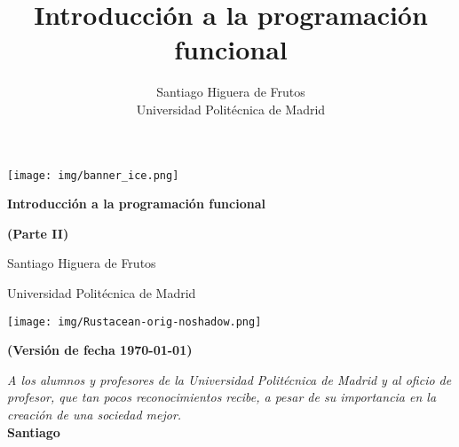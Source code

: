 \documentclass[11pt, table]{book}
\title{Introducción a la programación funcional}
\author{Santiago Higuera de Frutos \\ \vspace{1em}\small Universidad Politécnica de Madrid}
\date{ 
	\begin{center}
		\texttt{[image: img/Rustacean-orig-noshadow.png]}
	\end{center}
   \begin{center}
      \footnotesize \textbf{\color{red}(Versión de fecha  \today)}
   \end{center}
}
\begin{document}
\lstset{language=Rust, style=colouredRust}

\pagestyle{empty}

\begin{center}
   \texttt{[image: img/banner\_ice.png]}
\end{center}

{\centering \vspace{5em} \Huge\bfseries  Introducción a la programación funcional \par}

{\centering \vspace{5em} \Huge\bfseries  (Parte II) \par}

{\vspace{2em} \centering Santiago Higuera de Frutos \par}

{\centering \small Universidad Politécnica de Madrid \par}

\begin{center}
   \texttt{[image: img/Rustacean-orig-noshadow.png]}
\end{center}
\begin{center}
   \footnotesize \textbf{\color{red}(Versión de fecha  \today)}
\end{center}




\blankpage
\pagestyle{empty}

\vfill
\begin{flushright}
\begin{minipage}{0.7\textwidth}
\begin{flushright}
\footnotesize
\textit{A los alumnos y profesores de la Universidad Politécnica de Madrid y al oficio de profesor, que tan pocos reconocimientos recibe, a pesar de su importancia en la creación de una sociedad mejor.} \\
\textbf{Santiago}
\end{flushright}
\end{minipage}
\end{flushright}
\end{document}
